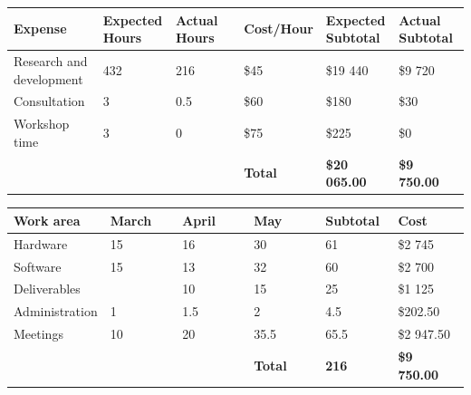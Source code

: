 \documentclass[12pt, a4paper]{article}
\begin{document}
            \begingroup
                \centering
                \begin{flushleft}
                \resizebox{\linewidth}{!} {
                    \begin{tabular}{| m{0.2\linewidth} | m{0.16\linewidth} | m{0.16\linewidth} | m{0.16\linewidth} | m{0.16\linewidth} | m{0.16\linewidth} |}
                        \hline
                        \textbf {Expense} & \textbf {Expected Hours} & \textbf {Actual Hours} & \textbf {Cost/Hour} & \textbf {Expected Subtotal} & \textbf {Actual Subtotal} \\ \hline
                        Research and development & 432 & 216 & \$45 & \$19 440 & \$9 720 \\ \hline
                        Consultation & 3 & 0.5 & \$60 & \$180 & \$30 \\ \hline
                        Workshop time & 3 & 0 & \$75 & \$225 & \$0 \\ \hline
                        & & & \textbf {Total} & \textbf {\$20 065.00} & \textbf {\$9 750.00} \\
                        \hline
                    \end{tabular}
                }
                \end{flushleft}
                \label{tbl:expensestable}
            \endgroup
            \begingroup
                \centering
                \begin{flushleft}
                \resizebox{\linewidth}{!} {
                    \begin{tabular}{| m{0.2\linewidth} | m{0.16\linewidth} | m{0.16\linewidth} | m{0.16\linewidth} | m{0.16\linewidth} | m{0.16\linewidth} |}
                        \hline
                        \textbf {Work area} & \textbf {March} & \textbf {April} & \textbf {May} & \textbf {Subtotal} & \textbf {Cost} \\ \hline
                        Hardware & 15 & 16 & 30 & 61 & \$2 745 \\ \hline
                        Software & 15 & 13 & 32 & 60 & \$2 700 \\ \hline
                        Deliverables & & 10 & 15 & 25 & \$1 125 \\ \hline
                        Administration & 1 & 1.5 & 2 & 4.5 & \$202.50 \\ \hline
                        Meetings & 10 & 20 & 35.5 & 65.5 & \$2 947.50 \\ \hline
                        & & & \textbf {Total} & \textbf {216} & \textbf {\$9 750.00} \\
                        \hline
                    \end{tabular}
                }
                \label{tbl:workareastable}
                \end{flushleft}
\end{document}
